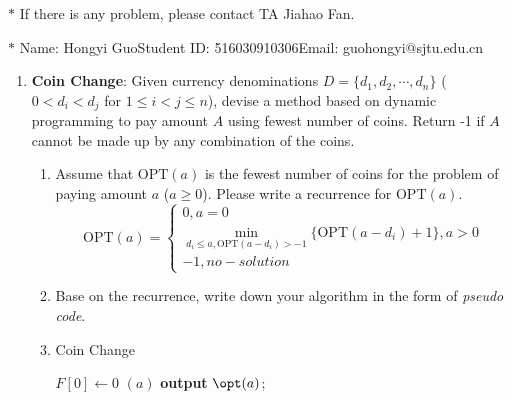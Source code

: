 \documentclass[12pt,a4paper]{article}
\makeatletter
\newtheorem*{solution}{Solution}
\theoremstyle{definition}
\renewenvironment{solution}[1][Solution] {\par\pushQED{\qed}\normalfont\topsep6\p@\@plus6\p@\relax\trivlist\item[\hskip\labelsep\bfseries#1\@addpunct{.}]\ignorespaces}{\popQED\endtrivlist\@endpefalse} \makeatother
\makeatother
\begin{document}
\noindent

\noindent{}
\begin{center}
\footnotesize{\color{red}$*$ If there is any problem, please contact TA Jiahao Fan. }

\footnotesize{\color{blue}$*$ Name: Hongyi Guo\quad Student ID: 516030910306\quad Email: guohongyi@sjtu.edu.cn}
\end{center}

\begin{enumerate}
\item
\textbf{Coin Change}: Given currency denominations $D=\{d_1, d_2,\cdots, d_n\}$ ($0 < d_i < d_j$ for $1 \leq i < j \leq n$), devise a method based on dynamic programming to pay amount $A$ using fewest number of coins. Return -1 if $A$ cannot be made up by any combination of the coins.

\begin{enumerate}
\item
Assume that $\text{OPT}(a)$ is the fewest number of coins for the problem of paying amount $a$ ($a \geq 0$). Please write a recurrence for $\text{OPT}(a)$.
$$\text{OPT}(a)=\begin{cases}
0,a=0\\
\min\limits_{d_i\leq a,\text{OPT}(a-d_i)>-1}\{\text{OPT}(a-d_i)+1\},a>0\\
-1,no-solution
\end{cases}$$

\item
Base on the recurrence, write down your algorithm in the form of \emph{pseudo code}.
\begin{solution}\quad
	
	\begin{minipage}{0.9\textwidth}
		\begin{algorithm}[H]
			\BlankLine
			\caption{Coin Change}\label{Alg_CoinChange}
			\BlankLine
			$F[0]\leftarrow 0$\;
			\BlankLine
			\opt$(a)$
			\BlankLine
			\textbf{output} $\opt(a)$;
		\end{algorithm}
	\end{minipage}
\end{solution}


\end{enumerate}
\end{enumerate}
\end{document}
